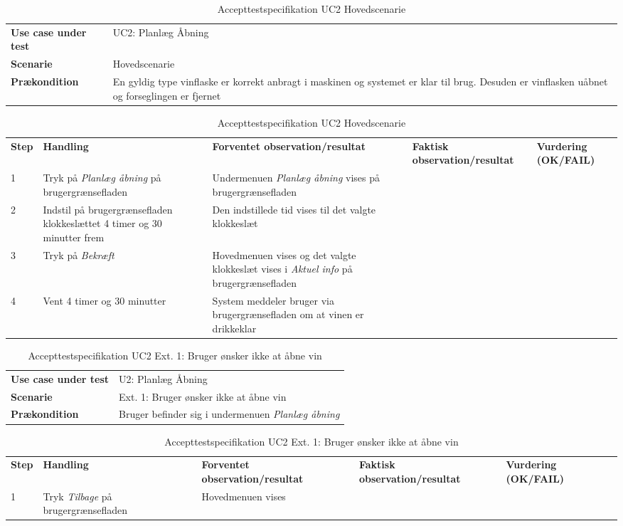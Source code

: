 \begin{table}[H]
	\centering
	\caption{Accepttestspecifikation UC2 Hovedscenarie}
	\label{ATUC2:Hovedscenarie}
	\begin{tabular}{ p{80pt}  p{320pt} }\hline
		\rowcolor{lightgray}	
		\textbf{Use case under test} & UC2: Planlæg Åbning \\
		\rowcolor{white}
		\textbf{Scenarie} & Hovedscenarie \\\rowcolor{lightgray}	
		\textbf{Prækondition} &
		En gyldig type vinflaske er korrekt anbragt i maskinen og systemet er klar til brug. Desuden er vinflasken uåbnet og forseglingen er fjernet \\
		\hline
	\end{tabular}
	\begin{tabular}{  p{26pt} p{100pt}  p{101pt} | p{67pt} | p{68pt}}
		\textbf{Step} & \textbf{Handling} & \textbf{Forventet observation/resultat} & \textbf{Faktisk observation/resultat} & \textbf{Vurdering (OK/FAIL)}\\
		1 & Tryk på \emph{Planlæg åbning} på brugergrænsefladen & Undermenuen \emph{Planlæg åbning} vises på brugergrænsefladen &  &  \\
		2 & Indstil på brugergrænsefladen klokkeslættet 4 timer og 30 minutter frem & Den indstillede tid vises til det valgte klokkeslæt &  &  \\
		3 & Tryk på \emph{Bekræft} & Hovedmenuen vises og det valgte klokkeslæt vises i \emph{Aktuel info} på brugergrænsefladen &  &  \\
		4 & Vent 4 timer og 30 minutter & System meddeler bruger via brugergrænsefladen om at vinen er drikkeklar &  &  \\
		\hline
	\end{tabular}
\end{table}

\begin{table}[H]
	\centering
	\caption{Accepttestspecifikation UC2 Ext. 1: Bruger ønsker ikke at åbne vin}
	\label{ATUC2:Ext1}
	\begin{tabular}{ p{80pt}  p{320pt} }\hline
		\rowcolor{lightgray}	
		\textbf{Use case under test} & U2: Planlæg Åbning \\
		\rowcolor{white}
		\textbf{Scenarie} & Ext. 1: Bruger ønsker ikke at åbne vin \\\rowcolor{lightgray}	
		\textbf{Prækondition} &
		Bruger befinder sig i undermenuen \emph{Planlæg åbning} \\
		\hline
	\end{tabular}
	\begin{tabular}{  p{26pt} p{100pt}  p{101pt} | p{67pt} | p{68pt}}
		\textbf{Step} & \textbf{Handling} & \textbf{Forventet observation/resultat} & \textbf{Faktisk observation/resultat} & \textbf{Vurdering (OK/FAIL)}\\
		1 & Tryk \emph{Tilbage} på brugergrænsefladen & Hovedmenuen vises
 &  &  \\
		\hline
	\end{tabular}
\end{table}

